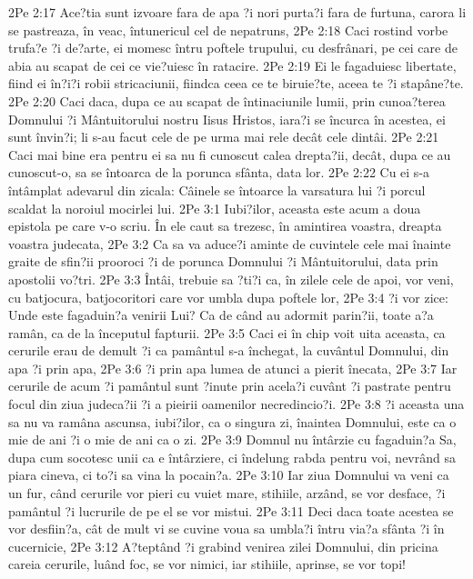 2Pe 2:17  Ace?tia sunt izvoare fara de apa ?i nori purta?i fara de furtuna, carora li se pastreaza, în veac, întunericul cel de nepatruns,
2Pe 2:18  Caci rostind vorbe trufa?e ?i de?arte, ei momesc întru poftele trupului, cu desfrânari, pe cei care de abia au scapat de cei ce vie?uiesc în ratacire.
2Pe 2:19  Ei le fagaduiesc libertate, fiind ei în?i?i robii stricaciunii, fiindca ceea ce te biruie?te, aceea te ?i stapâne?te.
2Pe 2:20  Caci daca, dupa ce au scapat de întinaciunile lumii, prin cunoa?terea Domnului ?i Mântuitorului nostru Iisus Hristos, iara?i se încurca în acestea, ei sunt învin?i; li s-au facut cele de pe urma mai rele decât cele dintâi.
2Pe 2:21  Caci mai bine era pentru ei sa nu fi cunoscut calea drepta?ii, decât, dupa ce au cunoscut-o, sa se întoarca de la porunca sfânta, data lor.
2Pe 2:22  Cu ei s-a întâmplat adevarul din zicala: Câinele se întoarce la varsatura lui ?i porcul scaldat la noroiul mocirlei lui.
2Pe 3:1  Iubi?ilor, aceasta este acum a doua epistola pe care v-o scriu. În ele caut sa trezesc, în amintirea voastra, dreapta voastra judecata,
2Pe 3:2  Ca sa va aduce?i aminte de cuvintele cele mai înainte graite de sfin?ii prooroci ?i de porunca Domnului ?i Mântuitorului, data prin apostolii vo?tri.
2Pe 3:3  Întâi, trebuie sa ?ti?i ca, în zilele cele de apoi, vor veni, cu batjocura, batjocoritori care vor umbla dupa poftele lor,
2Pe 3:4  ?i vor zice: Unde este fagaduin?a venirii Lui? Ca de când au adormit parin?ii, toate a?a ramân, ca de la începutul fapturii.
2Pe 3:5  Caci ei în chip voit uita aceasta, ca cerurile erau de demult ?i ca pamântul s-a închegat, la cuvântul Domnului, din apa ?i prin apa,
2Pe 3:6  ?i prin apa lumea de atunci a pierit înecata,
2Pe 3:7  Iar cerurile de acum ?i pamântul sunt ?inute prin acela?i cuvânt ?i pastrate pentru focul din ziua judeca?ii ?i a pieirii oamenilor necredincio?i.
2Pe 3:8  ?i aceasta una sa nu va ramâna ascunsa, iubi?ilor, ca o singura zi, înaintea Domnului, este ca o mie de ani ?i o mie de ani ca o zi.
2Pe 3:9  Domnul nu întârzie cu fagaduin?a Sa, dupa cum socotesc unii ca e întârziere, ci îndelung rabda pentru voi, nevrând sa piara cineva, ci to?i sa vina la pocain?a.
2Pe 3:10  Iar ziua Domnului va veni ca un fur, când cerurile vor pieri cu vuiet mare, stihiile, arzând, se vor desface, ?i pamântul ?i lucrurile de pe el se vor mistui.
2Pe 3:11  Deci daca toate acestea se vor desfiin?a, cât de mult vi se cuvine voua sa umbla?i întru via?a sfânta ?i în cucernicie,
2Pe 3:12  A?teptând ?i grabind venirea zilei Domnului, din pricina careia cerurile, luând foc, se vor nimici, iar stihiile, aprinse, se vor topi!
